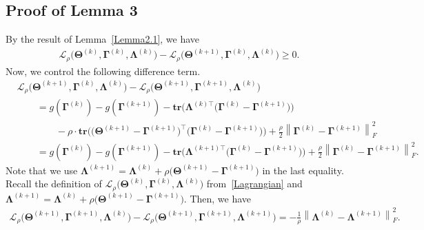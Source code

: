 \documentclass[alpha-refs]{wiley-article}
\begin{document}
\subsection{Proof of Lemma 3}
By the result of Lemma~\ref{Lemma2.1}, we have
\begin{align} \label{ineq1}
    \mathcal{L}_{\rho} \big( \boldsymbol{\Theta}^{(k)},\boldsymbol{\Gamma}^{(k)},\boldsymbol{\Lambda}^{(k)} \big)
    - \mathcal{L}_{\rho} \big( \boldsymbol{\Theta}^{(k+1)},\boldsymbol{\Gamma}^{(k)},\boldsymbol{\Lambda}^{(k)} \big)
    \geq 0.
\end{align}
Now, we control the following difference term.
\begin{align} \label{ineq2}
    &\mathcal{L}_{\rho} \big( \boldsymbol{\Theta}^{(k+1)},\boldsymbol{\Gamma}^{(k)},\boldsymbol{\Lambda}^{(k)} \big) - \mathcal{L}_{\rho} \big( \boldsymbol{\Theta}^{(k+1)},\boldsymbol{\Gamma}^{(k+1)},\boldsymbol{\Lambda}^{(k)} \big) \nonumber \\
    &\qquad = g(\boldsymbol{\Gamma}^{(k)})-g(\boldsymbol{\Gamma}^{(k+1)}) - \textbf{tr}\big( \boldsymbol{\Lambda}^{(k)\top}\big(\boldsymbol{\Gamma}^{(k)}-\boldsymbol{\Gamma}^{(k+1)}\big)\big) \nonumber \\
    &\qquad \qquad - \rho \cdot \textbf{tr}\big( \big(\boldsymbol{\Theta}^{(k+1)}-\boldsymbol{\Gamma}^{(k+1)}\big)^{\top}
    \big(\boldsymbol{\Gamma}^{(k)}-\boldsymbol{\Gamma}^{(k+1)}\big) \big) + \frac{\rho}{2}\left\| \boldsymbol{\Gamma}^{(k)}-\boldsymbol{\Gamma}^{(k+1)} \right\|_{F}^{2}  \nonumber \\
    &\qquad = g(\boldsymbol{\Gamma}^{(k)})-g(\boldsymbol{\Gamma}^{(k+1)}) - \textbf{tr}\big( \boldsymbol{\Lambda}^{(k+1)\top}\big(\boldsymbol{\Gamma}^{(k)}-\boldsymbol{\Gamma}^{(k+1)}\big)\big) + \frac{\rho}{2}\left\| \boldsymbol{\Gamma}^{(k)}-\boldsymbol{\Gamma}^{(k+1)} \right\|_{F}^{2}.
\end{align}
Note that we use $\boldsymbol{\Lambda}^{(k+1)}=\boldsymbol{\Lambda}^{(k)}+\rho\big(\boldsymbol{\Theta}^{(k+1)}-\boldsymbol{\Gamma}^{(k+1)}\big)$ in the last equality.
Recall the definition of $\mathcal{L}_{\rho} \big( \boldsymbol{\Theta}^{(k)},\boldsymbol{\Gamma}^{(k)},\boldsymbol{\Lambda}^{(k)} \big)$ from~\eqref{Lagrangian} and $\boldsymbol{\Lambda}^{(k+1)}=\boldsymbol{\Lambda}^{(k)}+\rho\big(\boldsymbol{\Theta}^{(k+1)}-\boldsymbol{\Gamma}^{(k+1)}\big)$.
Then, we have
\begin{align} \label{ineq3}
    \mathcal{L}_{\rho} \big( \boldsymbol{\Theta}^{(k+1)},\boldsymbol{\Gamma}^{(k+1)},\boldsymbol{\Lambda}^{(k)} \big)
    - \mathcal{L}_{\rho} \big( \boldsymbol{\Theta}^{(k+1)},\boldsymbol{\Gamma}^{(k+1)},\boldsymbol{\Lambda}^{(k+1)} \big)
    = -\frac{1}{\rho}\left\| \boldsymbol{\Lambda}^{(k)}-\boldsymbol{\Lambda}^{(k+1)} \right\|_{F}^{2}.
\end{align}
\end{document}
